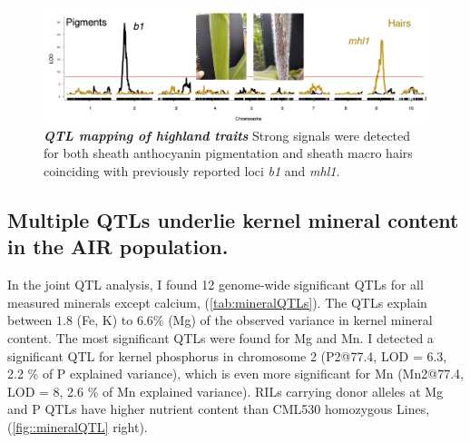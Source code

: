 \begin{figure}[!ht]
\includegraphics[width=\linewidth]{Chapter-4/figs/highland_traits.png}
\caption[QTL mapping of two highland traits]{\textit{\textbf{QTL mapping of highland traits}} Strong signals were detected for both sheath anthocyanin pigmentation and sheath macro hairs coinciding with previously reported loci \textit{b1} and  \textit{mhl1}.
}
\label{fig::highland_traits}
\end{figure}

\clearpage

\subsection{Multiple QTLs underlie kernel mineral content in the AIR population.}
In the joint QTL analysis, I found 12 genome-wide significant QTLs for all measured minerals except calcium, (\autoref{tab:mineralQTLs}). 
The QTLs explain between $1.8$ (Fe, K) to $6.6\%$ (Mg) of the observed variance in kernel mineral content. 
The most significant QTLs were found for Mg and Mn.
I detected a significant QTL for kernel phosphorus in chromosome 2 (P2@77.4, LOD = 6.3, 2.2 \% of P explained variance), which is even more significant for Mn (Mn2@77.4, LOD = 8, 2.6 \% of Mn explained variance).
RILs carrying donor alleles at Mg and P QTLs  have higher nutrient content than CML530 homozygous Lines,  (\autoref{fig::mineralQTL} right).


